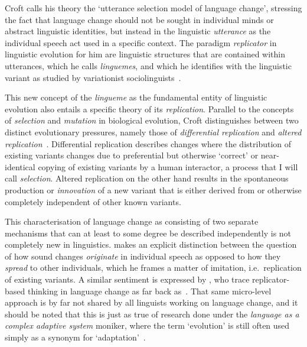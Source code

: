 Croft calls his theory the `utterance selection model of language change', stressing the fact that language change should not be sought in individual minds or abstract linguistic identities, but instead in the linguistic \emph{utterance} as the individual speech act used in a specific context. The paradigm \emph{replicator} in linguistic evolution for him are linguistic structures that are contained within utterances, which he calls \emph{linguemes}, and which he identifies with the linguistic variant as studied by variationist sociolinguists~\citep[p.104]{Croft2006}.

This new concept of the \emph{lingueme} as the fundamental entity of linguistic evolution also entails a specific theory of its \emph{replication}. Parallel to the concepts of \emph{selection} and \emph{mutation} in biological evolution, Croft distinguishes between two distinct evolutionary pressures, namely those of \emph{differential replication} and \emph{altered replication}~\citep{Croft2000}. Differential replication describes changes where the distribution of existing variants changes due to preferential but otherwise `correct' or near-identical copying of existing variants by a human interactor, a process that I will call \emph{selection}. Altered replication on the other hand results in the spontaneous production or \emph{innovation} of a new variant that is either derived from or otherwise completely independent of other known variants.

This characterisation of language change as consisting of two separate mechanisms that can at least to some degree be described independently is not completely new in linguistics.
\citet[ch.XV §11]{Jespersen1922} makes an explicit distinction between the question of how sound changes \emph{originate} in individual speech as opposed to how they \emph{spread} to other individuals, which he frames a matter of imitation, i.e.~replication of existing variants. A similar sentiment is expressed by \citet{Weinreich1968}, who trace replicator-based thinking in language change as far back as~\citet{Paul1880}.
That same micro-level approach is by far not shared by all linguists working on language change, and it should be noted that this is just as true of research done under the \emph{language as a complex adaptive system} moniker, where the term `evolution' is still often used simply as a synonym for `adaptation'~\citep{Croft2000}.


